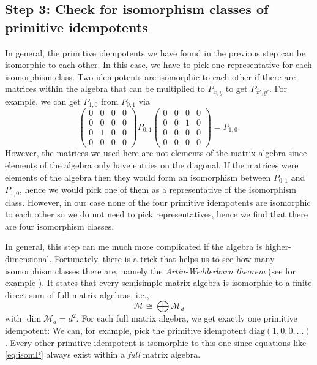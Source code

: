 {\subsection*{Step 3: Check for isomorphism classes of primitive idempotents}

In general, the primitive idempotents we have found in the previous step can be isomorphic to each other. In this case, we have to pick one representative for each isomorphism class. Two idempotents are isomorphic to each other if there are matrices within the algebra that can be multiplied to $P_{x,y}$ to get $P_{x',y'}$. For example, we can get $P_{1,0}$ from $P_{0,1}$ via 
	\begin{equation}
	\label{eq:isomP}
		\begin{pmatrix}
			0 & 0 & 0 & 0\\
			0 & 0 & 0 & 0\\
			0 & 1 & 0 & 0\\
			0 & 0 & 0 & 0
		\end{pmatrix}P_{0,1}
		\begin{pmatrix}
			0 & 0 & 0 & 0\\
			0 & 0 & 1 & 0\\
			0 & 0 & 0 & 0\\
			0 & 0 & 0 & 0
		\end{pmatrix}=P_{1,0}.
	\end{equation}
However, the matrices we used here are not elements of the matrix algebra since elements of the algebra only have entries on the diagonal. If the matrices were elements of the algebra then they would form an isomorphism between $P_{0,1}$ and $P_{1,0}$, hence we would pick one of them as a representative of the isomorphism class. However, in our case none of the four primitive idempotents are isomorphic to each other so we do not need to pick representatives, hence we find that there are four isomorphism classes.

In general, this step can me much more complicated if the algebra is higher-dimensional. Fortunately, there is a trick that helps us to see how many isomorphism classes there are, namely the \emph{Artin-Wedderburn theorem} (see for example \cite{Beachy1999}). It states that every semisimple matrix algebra is isomorphic to a finite direct sum of full matrix algebras, i.e.,
	\begin{equation}
		\mathcal{M}\cong \bigoplus\mathcal{M}_d
	\end{equation}
with $\dim\mathcal{M}_d=d^2$. For each full matrix algebra, we get exactly one primitive idempotent: We can, for example, pick the primitive idempotent $\mathrm{diag}(1,0,0,\dots)$. Every other primitive idempotent is isomorphic to this one since equations like \cref{eq:isomP} always exist within a \emph{full} matrix algebra. 

}

